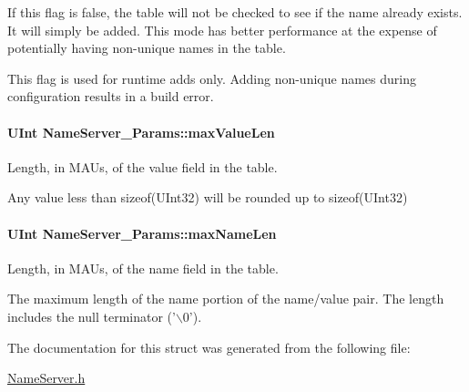 If this flag is false, the table will not be checked to see if the name already exists. It will simply be added. This mode has better performance at the expense of potentially having non-\/unique names in the table.

This flag is used for runtime adds only. Adding non-\/unique names during configuration results in a build error. 
\paragraph[{maxValueLen}]{\setlength{\rightskip}{0pt plus 5cm}UInt {\bf NameServer\_\-Params::maxValueLen}}\hfill\label{struct_name_server___params_afa31d4aaa38615278dd7d8b25603bf5d}
Length, in MAUs, of the value field in the table.

Any value less than sizeof(UInt32) will be rounded up to sizeof(UInt32) 
\paragraph[{maxNameLen}]{\setlength{\rightskip}{0pt plus 5cm}UInt {\bf NameServer\_\-Params::maxNameLen}}\hfill\label{struct_name_server___params_a8fcc951ae29abaa33f11360cc4fa6441}
Length, in MAUs, of the name field in the table.

The maximum length of the name portion of the name/value pair. The length includes the null terminator ('$\backslash$0'). 

The documentation for this struct was generated from the following file:\begin{DoxyCompactItemize}
\item 
\hyperlink{_name_server_8h}{NameServer.h}\end{DoxyCompactItemize}
